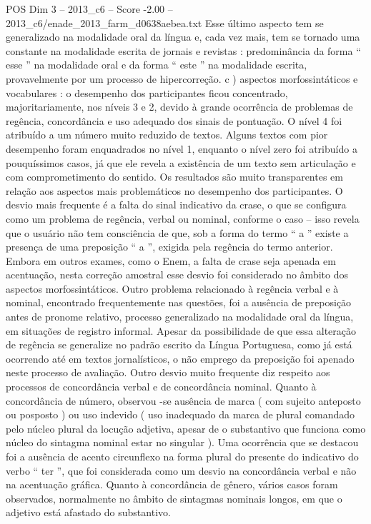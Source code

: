\begin{textsample}{POS Dim 3 – 2013\_c6 – Score -2.00 – 2013\_c6/enade\_2013\_farm\_d0638aebea.txt}
Esse último aspecto tem se generalizado na modalidade oral da língua e, cada vez mais, tem se tornado uma constante na modalidade escrita de jornais e revistas : predominância da forma “ esse ” na modalidade oral e da forma “ este ” na modalidade escrita, provavelmente por um processo de hipercorreção. c ) aspectos morfossintáticos e vocabulares : o desempenho dos participantes ficou concentrado, majoritariamente, nos níveis 3 e 2, devido à grande ocorrência de problemas de regência, concordância e uso adequado dos sinais de pontuação.
O nível 4 foi atribuído a um número muito reduzido de textos.
Alguns textos com pior desempenho foram enquadrados no nível 1, enquanto o nível zero foi atribuído a pouquíssimos casos, já que ele revela a existência de um texto sem articulação e com comprometimento do sentido.
Os resultados são muito transparentes em relação aos aspectos mais problemáticos no desempenho dos participantes.
O desvio mais frequente é a falta do sinal indicativo da crase, o que se configura como um problema de regência, verbal ou nominal, conforme o caso – isso revela que o usuário não tem consciência de que, sob a forma do termo “ a ” existe a presença de uma preposição “ a ”, exigida pela regência do termo anterior.
Embora em outros exames, como o Enem, a falta de crase seja apenada em acentuação, nesta correção amostral esse desvio foi considerado no âmbito dos aspectos morfossintáticos.
Outro problema relacionado à regência verbal e à nominal, encontrado frequentemente nas questões, foi a ausência de preposição antes de pronome relativo, processo generalizado na modalidade oral da língua, em situações de registro informal.
Apesar da possibilidade de que essa alteração de regência se generalize no padrão escrito da Língua Portuguesa, como já está ocorrendo até em textos jornalísticos, o não emprego da preposição foi apenado neste processo de avaliação.
Outro desvio muito frequente diz respeito aos processos de concordância verbal e de concordância nominal.
Quanto à concordância de número, observou -se ausência de marca ( com sujeito anteposto ou posposto ) ou uso indevido ( uso inadequado da marca de plural comandado pelo núcleo plural da locução adjetiva, apesar de o substantivo que funciona como núcleo do sintagma nominal estar no singular ).
Uma ocorrência que se destacou foi a ausência de acento circunflexo na forma plural do presente do indicativo do verbo “ ter ”, que foi considerada como um desvio na concordância verbal e não na acentuação gráfica.
Quanto à concordância de gênero, vários casos foram observados, normalmente no âmbito de sintagmas nominais longos, em que o adjetivo está afastado do substantivo.

\end{textsample}

